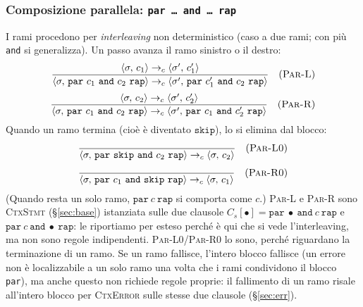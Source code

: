 \subsubsection{Composizione parallela: \texttt{par\,\dots\,and\,\dots\,rap}}
\label{sec:par}
I rami procedono per \emph{interleaving} non deterministico (caso a due rami; con
più \texttt{and} si generalizza). Un passo avanza il ramo sinistro o il destro:
\[
\dfrac{\cfg{c_1}{\sigma} \toc \cfg{c_1'}{\sigma'}}
      {\cfg{\mathtt{par}\ c_1\ \mathtt{and}\ c_2\ \mathtt{rap}}{\sigma} \toc
       \cfg{\mathtt{par}\ c_1'\ \mathtt{and}\ c_2\ \mathtt{rap}}{\sigma'}} \rname{Par-L}
\]
\[
\dfrac{\cfg{c_2}{\sigma} \toc \cfg{c_2'}{\sigma'}}
      {\cfg{\mathtt{par}\ c_1\ \mathtt{and}\ c_2\ \mathtt{rap}}{\sigma} \toc
       \cfg{\mathtt{par}\ c_1\ \mathtt{and}\ c_2'\ \mathtt{rap}}{\sigma'}} \rname{Par-R}
\]
Quando un ramo termina (cioè è diventato $\mathtt{skip}$), lo si elimina
dal blocco:
\[
\dfrac{}{\cfg{\mathtt{par}\ \mathtt{skip}\ \mathtt{and}\ c_2\ \mathtt{rap}}{\sigma} \toc
       \cfg{c_2}{\sigma}} \rname{Par-L0}
\]
\[
\dfrac{}{\cfg{\mathtt{par}\ c_1\ \mathtt{and}\ \mathtt{skip}\ \mathtt{rap}}{\sigma} \toc
       \cfg{c_1}{\sigma}} \rname{Par-R0}
\]
(Quando resta un solo ramo, $\mathtt{par}\ c\ \mathtt{rap}$ si comporta come
$c$.) \textsc{Par-L} e \textsc{Par-R} sono \textsc{CtxStmt} (\S\ref{sec:base})
istanziata sulle due clausole $C_s[\bullet] = \mathtt{par}\ \bullet\
\mathtt{and}\ c\ \mathtt{rap}$ e $\mathtt{par}\ c\ \mathtt{and}\ \bullet\
\mathtt{rap}$: le riportiamo per esteso perché è qui che si vede
l'interleaving, ma non sono regole indipendenti. \textsc{Par-L0}/\textsc{Par-R0}
lo sono, perché riguardano la terminazione di un ramo. Se un ramo fallisce,
l'intero blocco fallisce (un errore non è localizzabile a un solo ramo una
volta che i rami condividono il blocco \texttt{par}), ma anche questo non
richiede regole proprie: il fallimento di un ramo risale all'intero blocco
per \textcolor{red!60!black}{\textsc{CtxError}} sulle stesse due clausole
(\S\ref{sec:err}).

